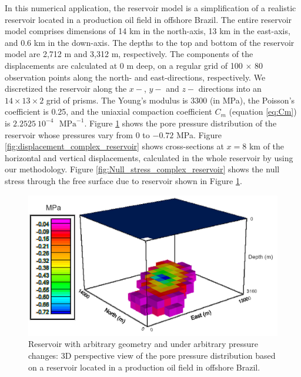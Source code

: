 \documentclass[P]{BrJG_submit}
\begin{document}
\vspace{0.5cm}

In this numerical application, the reservoir model is a simplification of a realistic reservoir located in a production oil field in offshore Brazil.
The entire reservoir model comprises dimensions of 14 km in the north-axis, 13 km in the
east-axis, and 0.6 km in the down-axis. 
The depths to the top and bottom of the reservoir model are 2,712 m and 3,312 m, respectively. 
The components of the displacements are calculated at 0 m deep, 
on a regular grid of 100 $\times$ 80  observation points along the north- and east-directions, respectively. 
We  discretized the reservoir  along the $x-$, $y-$ and $z-$ directions into an $14 \times 13 \times 2$ grid of prisms.
The Young’s modulus is  3300 (in MPa), the Poisson's coefficient is 0.25, and
the uniaxial compaction coefficient $C_{m}$  (equation \ref{eq:Cm}) is $2.2525 \: 10^{-4}$
$\textrm{ MPa}^{-1}$.
Figure \ref{fig:pressure_complex_reservoir} shows the pore pressure distribution of the reservoir whose pressures vary from $0$ to $-0.72$ MPa.
Figure \ref{fig:displacement_complex_reservoir} shows cross-sections at $x  = 8$ km of the horizontal and vertical displacements, calculated in the whole reservoir by using our methodology.
Figure \ref{fig:Null_stress_complex_reservoir} shows the  null stress through the free surface 
due to reservoir shown in Figure \ref{fig:pressure_complex_reservoir}.
\begin{figure}[h]
    \centering
    \includegraphics[scale=0.40]{figures/Figure_Pressure_complex_reservoir.png}
    \caption{Reservoir with arbitrary geometry and under arbitrary pressure changes: 3D perspective view of 
    the pore pressure distribution based on a reservoir located in a production oil field in offshore Brazil.}
	\label{fig:pressure_complex_reservoir}
\end{figure} 
\end{document}
